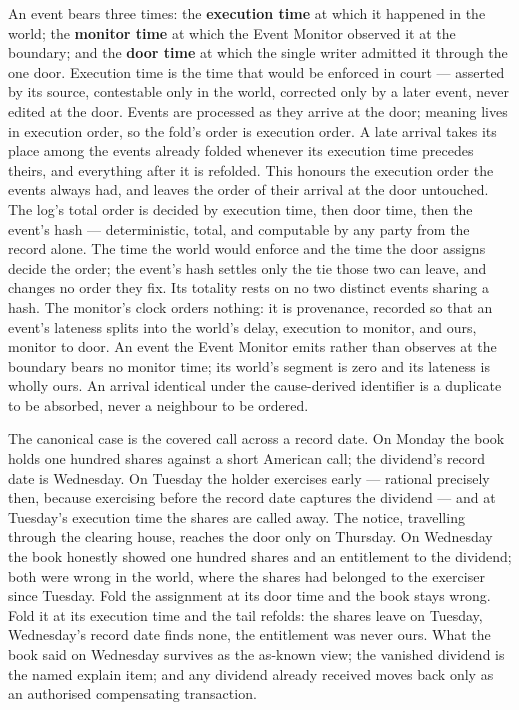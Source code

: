 \documentclass[11pt,a4paper]{article}
\begin{document}
An event bears three times: the \textbf{execution time} at which it
happened in the world; the \textbf{monitor time} at which the Event
Monitor observed it at the boundary; and the \textbf{door time} at
which the single writer admitted it through the one door. Execution
time is the time that would be enforced in court --- asserted by its
source, contestable only in the world, corrected only by a later
event, never edited at the door. Events are processed as they arrive
at the door; meaning lives in execution order, so the fold's order is
execution order. A late arrival takes its place among the events
already folded whenever its execution time precedes theirs, and
everything after it is refolded. This honours the execution order the
events always had, and leaves the order of their arrival at the door
untouched. The log's total order is decided by execution time, then
door time, then the event's hash --- deterministic, total, and
computable by any party from the record alone. The time the world
would enforce and the time the door assigns decide the order; the
event's hash settles only the tie those two can leave, and changes no
order they fix. Its totality rests on no two distinct events sharing a
hash. The monitor's clock orders nothing: it is provenance, recorded
so that an event's lateness splits into the world's delay, execution
to monitor, and ours, monitor to door. An event the Event Monitor
emits rather than observes at the boundary bears no monitor time; its
world's segment is zero and its lateness is wholly ours. An arrival
identical under the cause-derived identifier is a duplicate to be
absorbed, never a neighbour to be ordered.

The canonical case is the covered call across a record date. On Monday
the book holds one hundred shares against a short American call; the
dividend's record date is Wednesday. On Tuesday the holder exercises
early --- rational precisely then, because exercising before the record
date captures the dividend --- and at Tuesday's execution time the
shares are called away. The notice, travelling through the clearing
house, reaches the door only on Thursday. On Wednesday the book
honestly showed one hundred shares and an entitlement to the dividend;
both were wrong in the world, where the shares had belonged to the
exerciser since Tuesday. Fold the assignment at its door time and the
book stays wrong. Fold it at its execution time and the tail refolds:
the shares leave on Tuesday, Wednesday's record date finds none, the
entitlement was never ours. What the book said on Wednesday survives as
the as-known view; the vanished dividend is the named explain item; and
any dividend already received moves back only as an authorised
compensating transaction.
\end{document}
